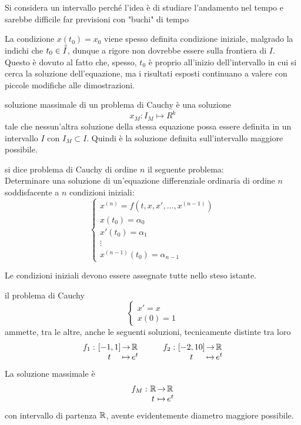 \begin{note}
	Si considera un intervallo perché l'idea è di studiare l'andamento nel tempo e sarebbe difficile far previsioni con "buchi" di tempo
\end{note}
\begin{note}
	La condizione $x(t_0) = x_0$ viene spesso definita condizione iniziale, malgrado la  indichi che $t_0 \in \accentset{\circ}{I}$, dunque a rigore non dovrebbe essere sulla frontiera di $I$. Questo è dovuto al fatto che, spesso, $t_0$ è proprio all'inizio dell'intervallo in cui si cerca la soluzione dell'equazione, ma i risultati esposti continuano a valere con piccole modifiche alle dimostrazioni.
\end{note}
\begin{definition}
	soluzione massimale di un problema di Cauchy è una soluzione $$x_M:I_M\mapsto R^k$$ tale che nessun'altra soluzione della stessa equazione possa essere definita in un intervallo $I$ con $I_M \subset I$. Quindi è la soluzione definita sull'intervallo maggiore possibile.
\end{definition}
\begin{definition}
	si dice problema di Cauchy di ordine $n$ il seguente problema:\\
	Determinare una soluzione di un'equazione differenziale ordinaria di ordine $n$ soddisfacente a $n$ condizioni iniziali:
	$$\begin{cases}
		x^{(n)}=f(t,x,x',\dotsc,x^{(n-1)})\\
		x(t_0)=\alpha_0\\
		x'(t_0)=\alpha_1\\
		\vdots\\
		x^{(n-1)}(t_0)=\alpha_{n-1}
	\end{cases}$$
\end{definition}
\begin{note}
	Le condizioni iniziali devono essere assegnate tutte nello steso istante.
\end{note}
\begin{example}
	il problema di Cauchy $$\begin{cases}x'=x\\x(0)=1\end{cases}$$
	ammette, tra le altre, anche le seguenti soluzioni, tecnicamente distinte tra loro
	$$\funcdef{f_1}t[\realintervalclose{-1}{1}]{\R}[e^t] \qquad \funcdef{f_2}t[\realintervalclose{-2}{10}]{\R}[e^t]$$
	La soluzione massimale è
	$$\funcdef{f_M}t[\R]{\R}[e^t]$$
	con intervallo di partenza $\mathbb{R}$, avente evidentemente diametro maggiore possibile.
\end{example}
